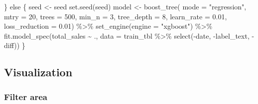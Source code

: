 \documentclass[
  11pt,
]{article}
\newenvironment{Shaded}{\begin{snugshade}}{\end{snugshade}}
\newcommand{\AttributeTok}[1]{\textcolor[rgb]{0.40,0.45,0.13}{#1}}
\newcommand{\ControlFlowTok}[1]{\textcolor[rgb]{0.00,0.23,0.31}{#1}}
\newcommand{\DecValTok}[1]{\textcolor[rgb]{0.68,0.00,0.00}{#1}}
\newcommand{\FloatTok}[1]{\textcolor[rgb]{0.68,0.00,0.00}{#1}}
\newcommand{\FunctionTok}[1]{\textcolor[rgb]{0.28,0.35,0.67}{#1}}
\newcommand{\NormalTok}[1]{\textcolor[rgb]{0.00,0.23,0.31}{#1}}
\newcommand{\OtherTok}[1]{\textcolor[rgb]{0.00,0.23,0.31}{#1}}
\newcommand{\SpecialCharTok}[1]{\textcolor[rgb]{0.37,0.37,0.37}{#1}}
\newcommand{\StringTok}[1]{\textcolor[rgb]{0.13,0.47,0.30}{#1}}
\begin{document}
\begin{Shaded}
\begin{Highlighting}[]
\NormalTok{  \} }\ControlFlowTok{else}\NormalTok{ \{}
\NormalTok{    seed }\OtherTok{\textless{}{-}}\NormalTok{ seed}
    \FunctionTok{set.seed}\NormalTok{(seed)}
\NormalTok{    model }\OtherTok{\textless{}{-}} \FunctionTok{boost\_tree}\NormalTok{(}
      \AttributeTok{mode =} \StringTok{"regression"}\NormalTok{,}
      \AttributeTok{mtry =} \DecValTok{20}\NormalTok{,}
      \AttributeTok{trees =} \DecValTok{500}\NormalTok{,}
      \AttributeTok{min\_n =} \DecValTok{3}\NormalTok{,}
      \AttributeTok{tree\_depth =} \DecValTok{8}\NormalTok{,}
      \AttributeTok{learn\_rate =} \FloatTok{0.01}\NormalTok{,}
      \AttributeTok{loss\_reduction =} \FloatTok{0.01}\NormalTok{) }\SpecialCharTok{\%\textgreater{}\%}
      \FunctionTok{set\_engine}\NormalTok{(}\AttributeTok{engine =} \StringTok{"xgboost"}\NormalTok{) }\SpecialCharTok{\%\textgreater{}\%}
      \FunctionTok{fit.model\_spec}\NormalTok{(total\_sales }\SpecialCharTok{\textasciitilde{}}\NormalTok{ .,}
                     \AttributeTok{data =}\NormalTok{ train\_tbl }\SpecialCharTok{\%\textgreater{}\%}
                       \FunctionTok{select}\NormalTok{(}\SpecialCharTok{{-}}\NormalTok{date, }\SpecialCharTok{{-}}\NormalTok{label\_text, }\SpecialCharTok{{-}}\NormalTok{diff))}
\NormalTok{  \}}
\end{Highlighting}
\end{Shaded}

\hypertarget{visualization}{%
\subsection{Visualization}\label{visualization}}

\hypertarget{filter-area}{%
\subsubsection{Filter area}\label{filter-area}}
\end{document}
